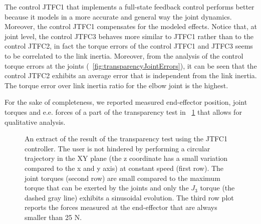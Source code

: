 \begin{figure*}[htbp]
	\centering
	\def\svgwidth{1.8\columnwidth}
	\begin{footnotesize}
		
	\end{footnotesize}
	\caption{Multi-joint transparency study. Mean absolute torque and mean absolute peak toque for the four Rehab-Exos actuated joints for the 10 subjects visualized as boxplots. The interaction torques have been evaluated for the 3 controllers in slow ($45 ~ \frac{deg}{s}$) and fast ($90 ~ \frac{deg}{s}$) speed conditions as proposed in \cite{just2018exoskeleton}. JFFC1 offered the lowest resistive toque in both conditions for all the joints with high statistical significance ('**', $p < 0.01$). }
	\label{fig:transparencyJointErrors}
\end{figure*}

%

The control JTFC1 that implements a full-state feedback control performs better because it models in a more accurate and general way the joint dynamics. Moreover, the control JTFC1 compensates for the modeled effects. Notice that, at joint level, the control JTFC3 behaves more similar to JTFC1 rather than to the control JTFC2, in fact the torque errors of the control JTFC1 and JTFC3 seems to be correlated to the link inertia.
Moreover, from the analysis of the control torque errors at the joints (\figurename \ \ref{fig:transparencyJointErrors}), it can be seen that the control JTFC2 exhibits an average error that is independent from the link inertia. The torque error over link inertia ratio for the elbow joint is the highest.

For the sake of completeness, we reported measured end-effector position, joint torques and e.e. forces of a part of the transparency test in \figurename \ \ref{fig:transparencyEeErrors} that allows for qualitative analysis.
\begin{figure}[htb]
	\centering
	\def\svgwidth{1\columnwidth}
	\begin{footnotesize}
		
	\end{footnotesize}
	\caption{An extract of the result of the transparency test using the JTFC1 controller. The user is not hindered by performing a circular trajectory in the XY plane (the z coordinate has a small variation compared to the x and y axis) at constant speed (first row). The
		joint torques (second row) are small compared to the maximum torque that can be exerted by the joints and only the
		$J_3$ torque (the dashed gray line) exhibits a sinusoidal evolution. The third row plot reports the forces measured at the
		end-effector that are always smaller than 25 N.}
	\label{fig:transparencyEeErrors}
\end{figure}
%

